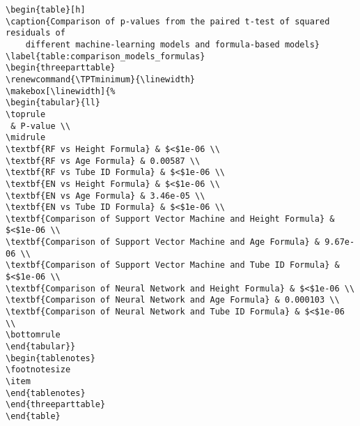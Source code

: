 \documentclass[11pt]{article}
\begin{document}
\begin{Verbatim}[tabsize=4]
\begin{table}[h]
\caption{Comparison of p-values from the paired t-test of squared residuals of
	different machine-learning models and formula-based models}
\label{table:comparison_models_formulas}
\begin{threeparttable}
\renewcommand{\TPTminimum}{\linewidth}
\makebox[\linewidth]{%
\begin{tabular}{ll}
\toprule
 & P-value \\
\midrule
\textbf{RF vs Height Formula} & $<$1e-06 \\
\textbf{RF vs Age Formula} & 0.00587 \\
\textbf{RF vs Tube ID Formula} & $<$1e-06 \\
\textbf{EN vs Height Formula} & $<$1e-06 \\
\textbf{EN vs Age Formula} & 3.46e-05 \\
\textbf{EN vs Tube ID Formula} & $<$1e-06 \\
\textbf{Comparison of Support Vector Machine and Height Formula} & $<$1e-06 \\
\textbf{Comparison of Support Vector Machine and Age Formula} & 9.67e-06 \\
\textbf{Comparison of Support Vector Machine and Tube ID Formula} & $<$1e-06 \\
\textbf{Comparison of Neural Network and Height Formula} & $<$1e-06 \\
\textbf{Comparison of Neural Network and Age Formula} & 0.000103 \\
\textbf{Comparison of Neural Network and Tube ID Formula} & $<$1e-06 \\
\bottomrule
\end{tabular}}
\begin{tablenotes}
\footnotesize
\item
\end{tablenotes}
\end{threeparttable}
\end{table}

\end{Verbatim}




\end{document}

